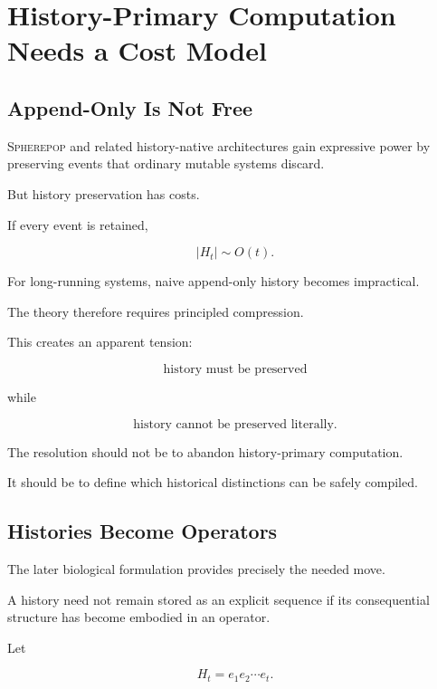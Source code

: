 \documentclass[11pt]{article}
\theoremstyle{remark}
\newcommand{\Spherepop}{\textsc{Spherepop}}
\begin{document}
\section{History-Primary Computation Needs a Cost Model}

\subsection{Append-Only Is Not Free}

\Spherepop{} and related history-native architectures gain expressive power by preserving events that ordinary mutable systems discard.

But history preservation has costs.

If every event is retained,

\begin{equation}
|H_t|
\sim
O(t).
\end{equation}

For long-running systems, naive append-only history becomes impractical.

The theory therefore requires principled compression.

This creates an apparent tension:

\begin{equation}
\text{history must be preserved}
\end{equation}

while

\begin{equation}
\text{history cannot be preserved literally}.
\end{equation}

The resolution should not be to abandon history-primary computation.

It should be to define which historical distinctions can be safely compiled.

\subsection{Histories Become Operators}

The later biological formulation provides precisely the needed move.

A history need not remain stored as an explicit sequence if its consequential structure has become embodied in an operator.

Let

\begin{equation}
H_t
=
e_1e_2\cdots e_t.
\end{equation}
\end{document}
